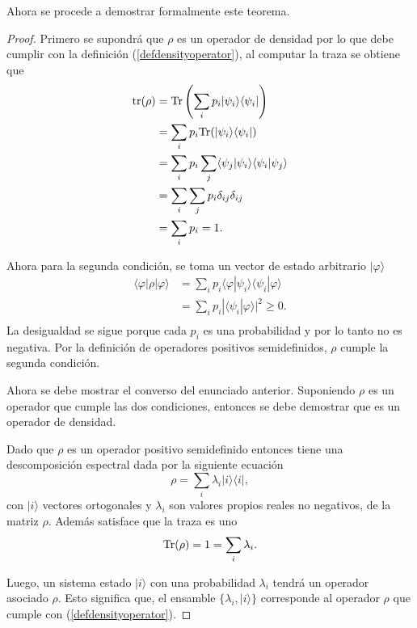 Ahora se procede a demostrar formalmente este teorema.
\begin{proof}
	Primero se supondrá que $\rho $ es un operador de densidad por lo que debe cumplir con la definición ({\ref{defdensityoperator}}), al computar la traza se obtiene que \begin{equation*}
		\begin{split}
			{\rm tr(\rho)}&={\rm Tr}\left(\sum_{i} p_i|\psi_i\rangle \langle \psi_i|\right) \\
			&=	\sum_{i}p_i {\rm Tr}(|\psi_i\rangle \langle \psi_i|)\\
			&=\sum_{i}p_i \sum_j\langle \psi_j|\psi_i\rangle \langle \psi_i|\psi_j\rangle\\
			&=\sum_{i}\sum_j p_i \delta_{ij} \delta_{ij}\\
			&=\sum_i p_i=1.\\
		\end{split}
	\end{equation*}

Ahora para la segunda condición, se toma un vector de estado arbitrario $|\varphi \rangle$ \begin{equation*}
	\begin{split}
	\langle \varphi |	\rho|\varphi \rangle&=\sum_{i}p_i\langle \varphi |\psi_i\rangle \langle \psi_i|\varphi \rangle \\
	&=\sum_{i}p_i| \langle \psi_i|\varphi \rangle|^2 \ge 0.\\
	\end{split}
\end{equation*}
La desigualdad se sigue porque cada $p_i$ es una probabilidad y por lo tanto no es negativa. Por la definición de operadores positivos semidefinidos, $\rho$ cumple la segunda condición.


Ahora se debe mostrar el converso del enunciado anterior. Suponiendo $\rho$ es un operador que cumple las dos condiciones, entonces se debe demostrar que es un operador de densidad.

Dado que $\rho$ es un operador positivo semidefinido entonces tiene una descomposición espectral dada por la siguiente ecuación {\cite{nielsen_chuang_2010}} \[\rho=\sum_i \lambda_i |i\rangle \langle i|,\] con $|i\rangle$ vectores ortogonales y $\lambda_i$ son valores propios reales no negativos, de la matriz $\rho$. Además satisface que la traza es uno 
\[{\rm Tr}(\rho)=1=\sum_i\lambda_i.\]

Luego, un sistema estado $|i\rangle$ con una probabilidad $\lambda_i$ tendrá un
operador asociado $\rho$. Esto significa que, el ensamble $\{\lambda_i,
|i\rangle\}$  corresponde al operador $\rho$ que cumple con
({\ref{defdensityoperator}}).


\end{proof}




